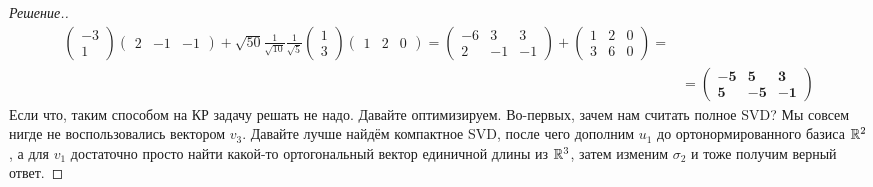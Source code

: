 \documentclass[a4paper]{article}
\theoremstyle{remark}
\begin{document}
\begin{proof}[Решение.]
\begin{align*}
\begin{pmatrix}
              -3 \\ 1
            \end{pmatrix} \begin{pmatrix}
              2 &
              -1 &
              -1
            \end{pmatrix} + \sqrt{50} \frac{1}{\sqrt{10}} \frac{1}{\sqrt{5}} \begin{pmatrix}
              1 \\
              3
            \end{pmatrix} \begin{pmatrix}
              1 & 2 & 0
            \end{pmatrix} = \begin{pmatrix}
              -6 & 3 & 3 \\
              2 & -1 & -1
            \end{pmatrix} + \begin{pmatrix}
              1 & 2 & 0 \\
              3 & 6 & 0
            \end{pmatrix} = \\ &= \begin{pmatrix}
              \bm{-5} & \bm{5} & \bm{3} \\
              \bm{5} & \bm{-5} & \bm{-1}
            \end{pmatrix}
          \end{align*} 
          Если что, таким способом на КР задачу решать не надо. Давайте оптимизируем. Во-первых, зачем нам считать полное SVD? Мы совсем нигде не воспользовались вектором $v_3$. Давайте лучше найдём компактное SVD, после чего дополним $u_1$ до ортонормированного базиса $\mathbb{R}^2$, а для $v_1$ достаточно просто найти какой-то ортогональный вектор единичной длины из $\mathbb{R}^3$, затем изменим $\sigma_2$ и тоже получим верный ответ.
          

\end{proof}
\end{document}
